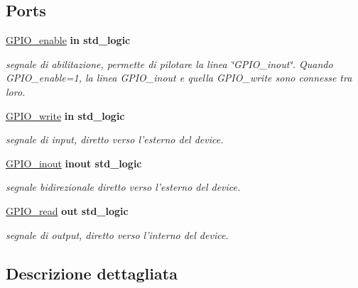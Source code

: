 \subsection*{Ports}
 \begin{DoxyCompactItemize}
\item 
\hypertarget{group___g_p_i_o-single_ga0ae7f62d9fa2c19d7ad2ad7574b58871}{\hyperlink{group___g_p_i_o-single_ga0ae7f62d9fa2c19d7ad2ad7574b58871}{G\+P\+I\+O\+\_\+enable}  {\bfseries {\bfseries \textcolor{vhdlchar}{in}\textcolor{vhdlchar}{ }}} {\bfseries \textcolor{vhdlchar}{std\+\_\+logic}\textcolor{vhdlchar}{ }} }\label{group___g_p_i_o-single_ga0ae7f62d9fa2c19d7ad2ad7574b58871}

\begin{DoxyCompactList}\small\item\em segnale di abilitazione, permette di pilotare la linea \char`\"{}\+G\+P\+I\+O\+\_\+inout\char`\"{}. Quando G\+P\+I\+O\+\_\+enable=1, la linea G\+P\+I\+O\+\_\+inout e quella G\+P\+I\+O\+\_\+write sono connesse tra loro. \end{DoxyCompactList}\item 
\hypertarget{group___g_p_i_o-single_ga20547939f304c722cb29df650d7ca7ef}{\hyperlink{group___g_p_i_o-single_ga20547939f304c722cb29df650d7ca7ef}{G\+P\+I\+O\+\_\+write}  {\bfseries {\bfseries \textcolor{vhdlchar}{in}\textcolor{vhdlchar}{ }}} {\bfseries \textcolor{vhdlchar}{std\+\_\+logic}\textcolor{vhdlchar}{ }} }\label{group___g_p_i_o-single_ga20547939f304c722cb29df650d7ca7ef}

\begin{DoxyCompactList}\small\item\em segnale di input, diretto verso l'esterno del device. \end{DoxyCompactList}\item 
\hypertarget{group___g_p_i_o-single_ga979707b3e6ce3920d653c07c91e80f70}{\hyperlink{group___g_p_i_o-single_ga979707b3e6ce3920d653c07c91e80f70}{G\+P\+I\+O\+\_\+inout}  {\bfseries {\bfseries \textcolor{vhdlchar}{inout}\textcolor{vhdlchar}{ }}} {\bfseries \textcolor{vhdlchar}{std\+\_\+logic}\textcolor{vhdlchar}{ }} }\label{group___g_p_i_o-single_ga979707b3e6ce3920d653c07c91e80f70}

\begin{DoxyCompactList}\small\item\em segnale bidirezionale diretto verso l'esterno del device. \end{DoxyCompactList}\item 
\hypertarget{group___g_p_i_o-single_ga4a6632a5d5cd6c4e6c1b634286795362}{\hyperlink{group___g_p_i_o-single_ga4a6632a5d5cd6c4e6c1b634286795362}{G\+P\+I\+O\+\_\+read}  {\bfseries {\bfseries \textcolor{vhdlchar}{out}\textcolor{vhdlchar}{ }}} {\bfseries \textcolor{vhdlchar}{std\+\_\+logic}\textcolor{vhdlchar}{ }} }\label{group___g_p_i_o-single_ga4a6632a5d5cd6c4e6c1b634286795362}

\begin{DoxyCompactList}\small\item\em segnale di output, diretto verso l'interno del device. \end{DoxyCompactList}\end{DoxyCompactItemize}


\subsection{Descrizione dettagliata}
